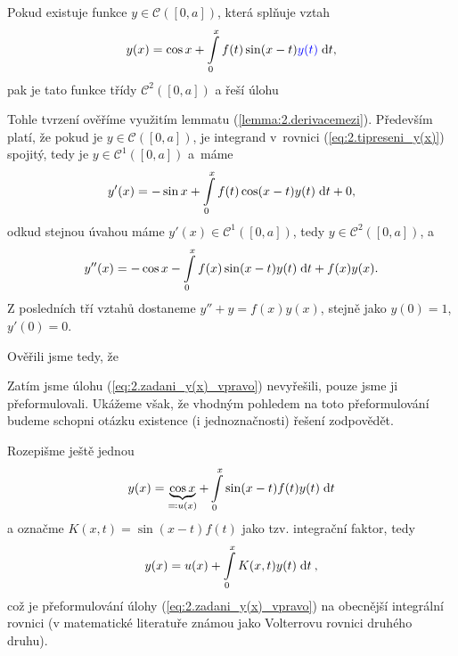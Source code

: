 Pokud existuje funkce $y\in \mathcal{C} \left( [0,a] \right)$, která splňuje vztah
\begin{equation}
    y(x) = \cos x + \int\limits_0^x f(t)\sin(x-t)\textcolor{blue}{y(t)}\;\mathrm{d}t,
    \label{eq:2.tipreseni_y(x)}
\end{equation}
pak je tato funkce třídy $\mathcal{C}^2 \left([0,a] \right)$ a řeší úlohu %

Tohle tvrzení ověříme využitím lemmatu (\ref{lemma:2.derivacemezi}). Především platí, že pokud je $y\in \mathcal{C} \left([0,a] \right)$, je integrand v~rovnici (\ref{eq:2.tipreseni_y(x)}) spojitý, tedy je $y\in\mathcal{C}^1([0,a])$ a~máme
\begin{equation}
    y'(x) = -\sin x + \int\limits_0^x f(t)\cos(x-t)y(t)\;\mathrm{d}t + 0,
\end{equation}
odkud stejnou úvahou máme $y'(x)\in\mathcal{C}^1([0,a])$, tedy $y\in\mathcal{C}^2([0,a])$, a 
\begin{equation}
    y''(x) = -\cos x -\int\limits_0^x f(x) \sin(x-t)y(t)\;\mathrm{d}t + f(x)y(x).
\end{equation}
Z posledních tří vztahů dostaneme $y''+y=f(x)y(x)$, stejně jako $y(0)=1$, $y'(0)=0$.

Ověřili jsme tedy, že
\begin{figure}[H]
    \centering
\end{figure}

Zatím jsme úlohu (\ref{eq:2.zadani_y(x)_vpravo}) nevyřešili, pouze jsme ji přeformulovali. Ukážeme však, že vhodným pohledem na toto přeformulování budeme schopni otázku existence (i jednoznačnosti) řešení zodpovědět.

Rozepišme ještě jednou 
\begin{equation}
    y(x)=\underbrace{\cos x}_{\eqqcolon u(x)} + \int\limits_0^x \sin(x-t)f(t) y(t) \;\mathrm{d}t
\end{equation}
a označme $K(x,t) = \sin(x-t)f(t)$ jako tzv. integrační faktor, tedy
\begin{equation}
    y(x) = u(x) + \int\limits_0^xK(x,t)y(t)\;\mathrm{d}t \:,
    \label{eq:2.zadani_preformulovano}
\end{equation}
což je přeformulování úlohy (\ref{eq:2.zadani_y(x)_vpravo}) na obecnější integrální rovnici (v matematické literatuře známou jako Volterrovu rovnici druhého druhu).

